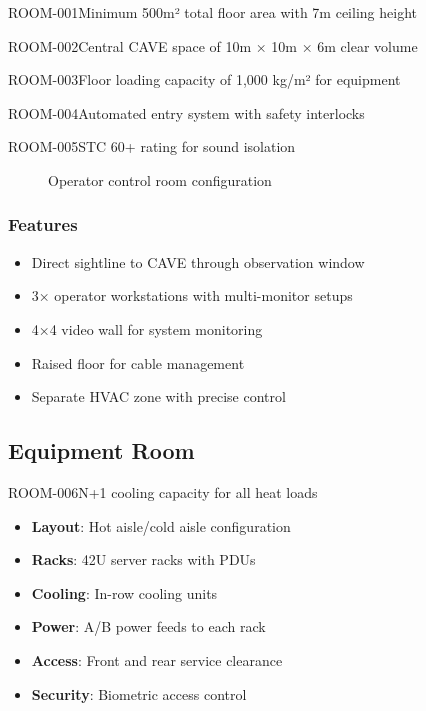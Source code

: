 \begin{requirement}{ROOM-001}{Minimum 500m² total floor area with 7m ceiling height}
\begin{requirement}{ROOM-002}{Central CAVE space of 10m × 10m × 6m clear volume}
\begin{requirement}{ROOM-003}{Floor loading capacity of 1,000 kg/m² for equipment}
\begin{requirement}{ROOM-004}{Automated entry system with safety interlocks}
\begin{requirement}{ROOM-005}{STC 60+ rating for sound isolation}
\begin{figure}[H]
\caption{Operator control room configuration}
\end{figure}

\subsubsection{Features}
\begin{itemize}
    \item Direct sightline to CAVE through observation window
    \item 3× operator workstations with multi-monitor setups
    \item 4×4 video wall for system monitoring
    \item Raised floor for cable management
    \item Separate HVAC zone with precise control
\end{itemize}

\subsection{Equipment Room}

\begin{requirement}{ROOM-006}{N+1 cooling capacity for all heat loads}

\begin{itemize}
    \item \textbf{Layout}: Hot aisle/cold aisle configuration
    \item \textbf{Racks}: 42U server racks with PDUs
    \item \textbf{Cooling}: In-row cooling units
    \item \textbf{Power}: A/B power feeds to each rack
    \item \textbf{Access}: Front and rear service clearance
    \item \textbf{Security}: Biometric access control
\end{itemize}


\end{requirement}
\end{requirement}
\end{requirement}
\end{requirement}
\end{requirement}
\end{requirement}
